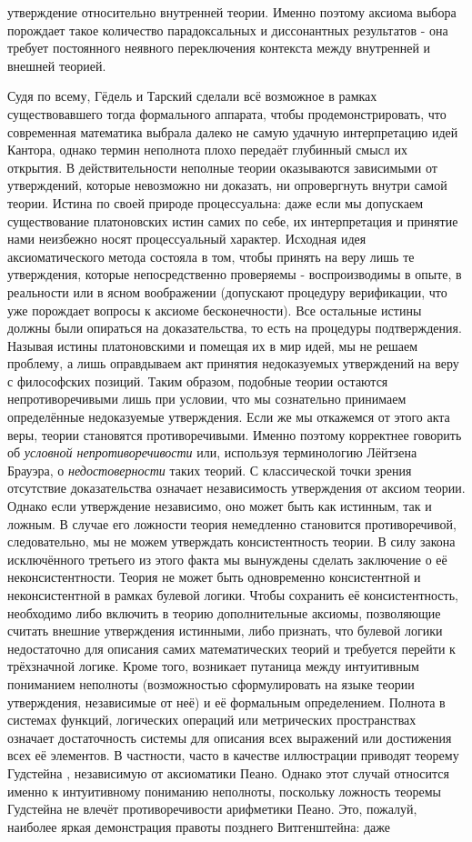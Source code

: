 \documentclass[12pt]{article}
\begin{document}
утверждение относительно внутренней теории. Именно поэтому аксиома выбора порождает такое количество парадоксальных и диссонантных результатов - она требует постоянного неявного переключения контекста между внутренней и внешней теорией.

Судя по всему, Гёдель и Тарский сделали всё возможное в рамках существовавшего тогда формального аппарата, чтобы продемонстрировать, что современная математика выбрала далеко не самую удачную интерпретацию идей Кантора, однако термин неполнота плохо передаёт глубинный смысл их открытия. В действительности неполные теории оказываются зависимыми от утверждений, которые невозможно ни доказать, ни опровергнуть внутри самой теории. Истина по своей природе процессуальна: даже если мы допускаем существование платоновских истин самих по себе, их интерпретация и принятие нами неизбежно носят процессуальный характер. Исходная идея аксиоматического метода состояла в том, чтобы принять на веру лишь те утверждения, которые непосредственно проверяемы - воспроизводимы в опыте, в реальности или в ясном воображении (допускают процедуру верификации, что уже порождает вопросы к аксиоме бесконечности). Все остальные истины должны были опираться на доказательства, то есть на процедуры подтверждения. Называя истины платоновскими и помещая их в мир идей, мы не решаем проблему, а лишь оправдываем акт принятия недоказуемых утверждений на веру с философских позиций. Таким образом, подобные теории остаются непротиворечивыми лишь при условии, что мы сознательно принимаем определённые недоказуемые утверждения. Если же мы откажемся от этого акта веры, теории становятся противоречивыми. Именно поэтому корректнее говорить об {\it условной непротиворечивости} или, используя терминологию Лёйтзена Брауэра, о {\it недостоверности} таких теорий. С классической точки зрения отсутствие доказательства означает независимость утверждения от аксиом теории. Однако если утверждение независимо, оно может быть как истинным, так и ложным. В случае его ложности теория немедленно становится противоречивой, следовательно, мы не можем утверждать консистентность теории. В силу закона исключённого третьего из этого факта мы вынуждены сделать заключение о её неконсистентности. Теория не может быть одновременно консистентной и неконсистентной в рамках булевой логики. Чтобы сохранить её консистентность, необходимо либо включить в теорию дополнительные аксиомы, позволяющие считать внешние утверждения истинными, либо признать, что булевой логики недостаточно для описания самих математических теорий и требуется перейти к трёхзначной логике. Кроме того, возникает путаница между интуитивным пониманием неполноты (возможностью сформулировать на языке теории утверждения, независимые от неё) и её формальным определением. Полнота в системах функций, логических операций или метрических пространствах означает достаточность системы для описания всех выражений или достижения всех её элементов. В частности, часто в качестве иллюстрации приводят теорему Гудстейна \cite{goodstein}, независимую от аксиоматики Пеано. Однако этот случай относится именно к интуитивному пониманию неполноты, поскольку ложность теоремы Гудстейна не влечёт противоречивости арифметики Пеано. Это, пожалуй, наиболее яркая демонстрация правоты позднего Витгенштейна: даже 
\end{document}
